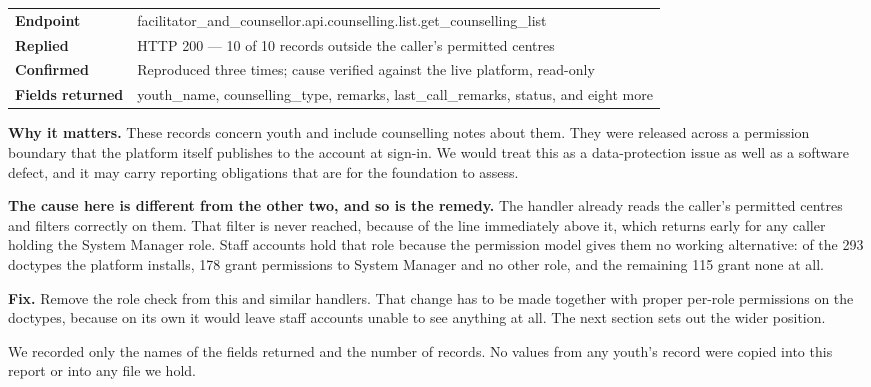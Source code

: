 \documentclass[10pt,a4paper]{article}
\newcommand{\code}[1]{{\ttfamily #1}}
\begin{document}
\vspace{0.3em}
{\footnotesize
\begin{tabularx}{\textwidth}{@{}p{2.45cm}L@{}}
\textbf{Endpoint} & \code{facilitator\_and\_counsellor.api.counselling.list.get\_counselling\_list} \\
\textbf{Replied} & HTTP 200 — 10 of 10 records outside the caller's permitted centres \\
\textbf{Confirmed} & Reproduced three times; cause verified against the live platform, read-only \\
\textbf{Fields returned} & \code{youth\_name}, \code{counselling\_type}, \code{remarks}, \code{last\_call\_remarks}, \code{status}, and eight more \\
\end{tabularx}\par}

\vspace{0.35em}
\textbf{Why it matters.} These records concern youth and include counselling notes about
them. They were released across a permission boundary that the platform itself publishes to the
account at sign-in. We would treat this as a data-protection issue as well as a software defect,
and it may carry reporting obligations that are for the foundation to assess.

\textbf{The cause here is different from the other two, and so is the remedy.} The handler
already reads the caller's permitted centres and filters correctly on them. That filter is never
reached, because of the line immediately above it, which returns early for any caller holding the
\code{System Manager} role. Staff accounts hold that role because the permission model gives them
no working alternative: of the 293 doctypes the platform installs, 178 grant permissions to
\code{System Manager} and no other role, and the remaining 115 grant none at all.

\textbf{Fix.} Remove the role check from this and similar handlers. That change has to be made
together with proper per-role permissions on the doctypes, because on its own it would leave staff
accounts unable to see anything at all. The next section sets out the wider position.

\vspace{0.4em}
{\footnotesize\color{muted}We recorded only the names of the fields returned and the number of
records. No values from any youth's record were copied into this report or into any file we
hold.\par}
\end{document}
